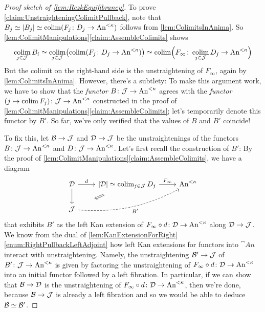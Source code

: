 \begin{proof}[Proof sketch of \cref{lem:RezkEquifibrancy}]
	To prove \cref{claim:UnstraighteningColimitPullback}, note that $B_j\simeq \left|B_j\right|\simeq \colimit (F_j\colon D_j\rightarrow \cat{An}^{<\kappa})$ follows from \cref{lem:ColimitsInAnima}. So \cref{lem:ColimitManipulations}\cref{claim:AssembleColimits} shows
	\begin{equation*}
		\colimit_{j\in\Jj}B_i\simeq \colimit_{j\in\Jj}\left(\colimit(F_j\colon D_j\rightarrow \cat{An}^{<\kappa})\right)\simeq \colimit\Bigl(F_\infty\colon \colimit_{j\in\Jj}D_j\rightarrow\cat{An}^{<\kappa}\Bigr)
	\end{equation*}
	But the colimit on the right-hand side is the unstraightening of $F_\infty$, again by \cref{lem:ColimitsInAnima}. However, there's a subtlety: To make this argument work, we have to show that the \emph{functor} $B\colon \mathcal{J}\rightarrow \mathrm{An}^{<\kappa}$ agrees with the \emph{functor} $(j\mapsto \operatorname*{colim} F_j)\colon \mathcal{J}\rightarrow\mathrm{An}^{<\kappa}$ constructed in the proof of \cref{lem:ColimitManipulations}\cref{claim:AssembleColimits}; let's temporarily denote this functor by $B'$. So far, we've only verified that the values of $B$ and $B'$ coincide! 
	
	To fix this, let $\mathcal{B}\rightarrow \mathcal{J}$ and $\mathcal{D}\rightarrow \mathcal{J}$ be the unstraightenings of the functors $B\colon \mathcal{J}\rightarrow \mathrm{An}^{<\kappa}$ and $D\colon \mathcal{J}\rightarrow \mathrm{An}^{<\kappa}$. Let's first recall the construction of $B'$: By the proof of \cref{lem:ColimitManipulations}\cref{claim:AssembleColimits}, we have a diagram
	\begin{equation*}
		\begin{tikzcd}
			\Dd\rar["d"]\dar &\left|\Dd\right|\simeq \colimit_{j\in\Jj}D_j\rar["F_\infty"]\dlar[phantom,start anchor=center,end anchor=center,"\Longleftarrow"{sloped,pos=0.5}] & \cat{An}^{<\kappa}\\
			\Jj\ar[urr,bend right=15,dashed,"B'"'] & & 
		\end{tikzcd}
	\end{equation*}
	that exhibits $B'$ as the left Kan extension of $F_\infty\circ d\colon \mathcal{D}\rightarrow \mathrm{An}^{<\kappa}$ along $\mathcal{D}\rightarrow \mathcal{J}$. We know from the dual of \cref{lem:KanExtensionForRight}\cref{enum:RightPullbackLeftAdjoint} how left Kan extensions for functors into $\cat{An}$ interact with unstraightening. Namely, the unstraightening $\mathcal{B}'\rightarrow \mathcal{J}$ of $B'\colon \mathcal{J}\rightarrow \mathrm{An}^{<\kappa}$ is given by factoring the unstraightening of $F_\infty\circ d\colon \mathcal{D}\rightarrow \mathrm{An}^{<\kappa}$ into an initial functor followed by a left fibration. In particular, if we can show that $\mathcal{B}\rightarrow\mathcal{D}$ is the unstraightening of $F_\infty\circ d\colon \mathcal{D}\rightarrow \mathrm{An}^{<\kappa}$, then we're done, because $\mathcal{B}\rightarrow\mathcal{J}$ is already a left fibration and so we would be able to deduce $\mathcal{B}\simeq \mathcal{B}'$.
	

\end{proof}
